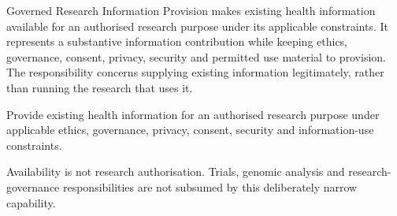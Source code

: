 Governed Research Information Provision makes existing health information available for an authorised research purpose under its applicable constraints. It represents a substantive information contribution while keeping ethics, governance, consent, privacy, security and permitted use material to provision. The responsibility concerns supplying existing information legitimately, rather than running the research that uses it.



Provide existing health information for an authorised research purpose under applicable ethics, governance, privacy, consent, security and information-use constraints.



Availability is not research authorisation. Trials, genomic analysis and research-governance responsibilities are not subsumed by this deliberately narrow capability.


